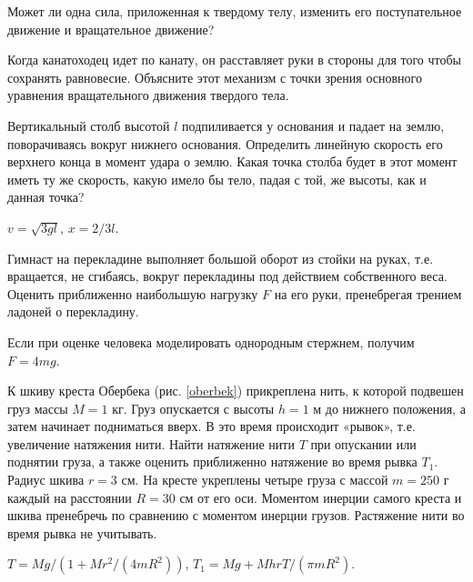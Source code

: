 \qualProblems

\begin{ex}
Может ли одна сила, приложенная к твердому телу, изменить его поступательное движение и вращательное движение?
\end{ex}	

\begin{ex}
Когда канатоходец идет по канату, он расставляет руки в стороны для того чтобы сохранять равновесие. Объясните этот механизм с точки зрения основного уравнения вращательного движения твердого тела.
\end{ex}	

\simpleProblems

\begin{ex} %
Вертикальный столб высотой $l$ подпиливается у основания и падает на землю, поворачиваясь вокруг нижнего основания. Определить линейную скорость его верхнего конца в момент удара о землю. Какая точка столба будет в этот момент иметь ту же скорость, какую имело бы тело, падая с той, же высоты, как и данная точка?
\begin{ans}
$v = \sqrt{3gl}$, $x = 2/3l$.
\end{ans}
\end{ex}	

\begin{ex} %
Гимнаст на перекладине выполняет большой оборот из стойки на руках, т.е. вращается, не сгибаясь, вокруг перекладины под действием собственного веса. Оценить приближенно наибольшую нагрузку $F$ на его руки, пренебрегая трением ладоней о перекладину.
\begin{ans}
Если при оценке человека моделировать однородным стержнем, получим $F = 4mg$.
\end{ans}
\end{ex}	

\begin{ex} %
К шкиву креста Обербека (рис. \ref{oberbek}) прикреплена нить, к которой подвешен груз массы $M = 1$ кг. Груз опускается с высоты $h = 1$ м до нижнего положения, а затем начинает подниматься вверх. В это время происходит «рывок», т.е. увеличение натяжения нити. Найти натяжение нити $T$ при опускании или поднятии груза, а также оценить приближенно натяжение во время рывка $T_1$. Радиус шкива $r = 3$ см. На кресте укреплены четыре груза с массой $m = 250$ г каждый на расстоянии $R = 30$ см от его оси. Моментом инерции самого креста и шкива пренебречь по сравнению с моментом инерции грузов. Растяжение нити во время рывка не учитывать.
\begin{ans}
$T = Mg/(1 + Mr^2/(4mR^2))$, $T_1 = Mg + MhrT/(\pi m R^2)$.
\end{ans}
\end{ex}	

